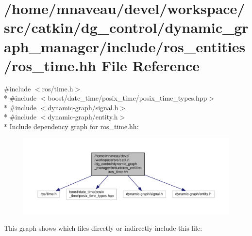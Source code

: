 \hypertarget{ros__time_8hh}{}\section{/home/mnaveau/devel/workspace/src/catkin/dg\+\_\+control/dynamic\+\_\+graph\+\_\+manager/include/ros\+\_\+entities/ros\+\_\+time.hh File Reference}
\label{ros__time_8hh}
{\ttfamily \#include $<$ros/time.\+h$>$}\\*
{\ttfamily \#include $<$boost/date\+\_\+time/posix\+\_\+time/posix\+\_\+time\+\_\+types.\+hpp$>$}\\*
{\ttfamily \#include $<$dynamic-\/graph/signal.\+h$>$}\\*
{\ttfamily \#include $<$dynamic-\/graph/entity.\+h$>$}\\*
Include dependency graph for ros\+\_\+time.\+hh\+:\nopagebreak
\begin{figure}[H]
\begin{center}
\leavevmode
\includegraphics[width=350pt]{ros__time_8hh__incl}
\end{center}
\end{figure}
This graph shows which files directly or indirectly include this file\+:\nopagebreak
